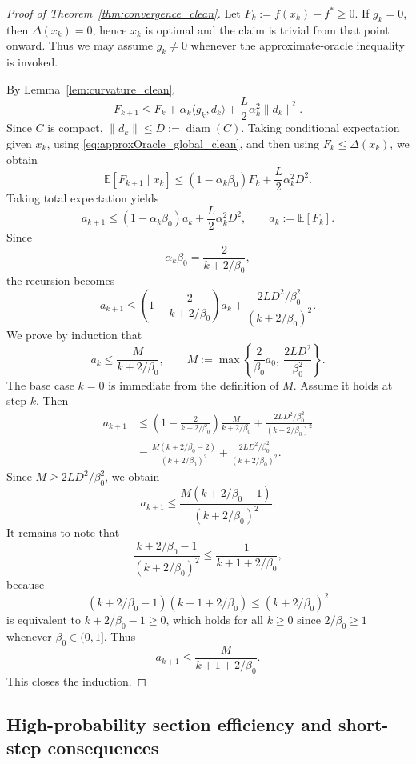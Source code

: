 \documentclass{article}
\begin{document}
\begin{proof}[Proof of Theorem~\ref{thm:convergence_clean}]
Let $F_k:=f(x_k)-f^*\ge 0$.
If $g_k=0$, then $\Delta(x_k)=0$, hence $x_k$ is optimal and the claim is trivial from that point onward.
Thus we may assume $g_k\neq 0$ whenever the approximate-oracle inequality is invoked.

By Lemma~\ref{lem:curvature_clean},
\[
F_{k+1}\le F_k+\alpha_k\langle g_k,d_k\rangle+\frac{L}{2}\alpha_k^2\|d_k\|^2.
\]
Since $C$ is compact, $\|d_k\|\le D:=\operatorname{diam}(C)$.
Taking conditional expectation given $x_k$, using \eqref{eq:approxOracle_global_clean}, and then using $F_k\le \Delta(x_k)$, we obtain
\[
\mathbb E[F_{k+1}\mid x_k]\le (1-\alpha_k\beta_0)F_k+\frac{L}{2}\alpha_k^2D^2.
\]
Taking total expectation yields
\[
a_{k+1}\le (1-\alpha_k\beta_0)a_k+\frac{L}{2}\alpha_k^2D^2,
\qquad a_k:=\mathbb E[F_k].
\]
Since
\[
\alpha_k\beta_0=\frac{2}{k+2/\beta_0},
\]
the recursion becomes
\[
a_{k+1}
\le
\left(1-\frac{2}{k+2/\beta_0}\right)a_k
+
\frac{2LD^2/\beta_0^2}{(k+2/\beta_0)^2}.
\]
We prove by induction that
\[
a_k\le \frac{M}{k+2/\beta_0},
\qquad
M:=\max\!\left\{\frac{2}{\beta_0}a_0,\ \frac{2LD^2}{\beta_0^2}\right\}.
\]
The base case $k=0$ is immediate from the definition of $M$.
Assume it holds at step $k$. Then
\begin{align*}
a_{k+1}
&\le
\left(1-\frac{2}{k+2/\beta_0}\right)\frac{M}{k+2/\beta_0}
+
\frac{2LD^2/\beta_0^2}{(k+2/\beta_0)^2}\\
&=
\frac{M(k+2/\beta_0-2)}{(k+2/\beta_0)^2}
+
\frac{2LD^2/\beta_0^2}{(k+2/\beta_0)^2}.
\end{align*}
Since $M\ge 2LD^2/\beta_0^2$, we obtain
\[
a_{k+1}
\le
\frac{M(k+2/\beta_0-1)}{(k+2/\beta_0)^2}.
\]
It remains to note that
\[
\frac{k+2/\beta_0-1}{(k+2/\beta_0)^2}
\le
\frac{1}{k+1+2/\beta_0},
\]
because
\[
(k+2/\beta_0-1)(k+1+2/\beta_0)\le (k+2/\beta_0)^2
\]
is equivalent to $k+2/\beta_0-1\ge 0$, which holds for all $k\ge 0$ since $2/\beta_0\ge 1$ whenever $\beta_0\in(0,1]$.
Thus
\[
a_{k+1}\le \frac{M}{k+1+2/\beta_0}.
\]
This closes the induction.
\end{proof}








\subsection{High-probability section efficiency and short-step consequences}
\label{app:hp-gamma-short-step}
\end{document}

